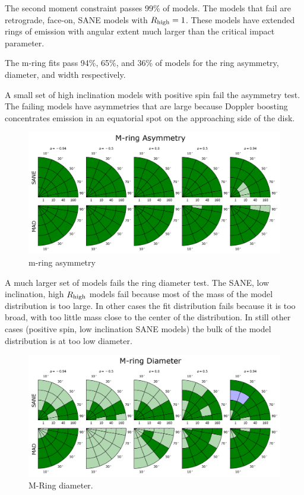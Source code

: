 The second moment constraint passes 99\% of models.  The models that fail are retrograde, face-on, SANE models with $R_\mathrm{high} = 1$. These models have extended rings of emission with angular extent much larger than the critical impact parameter.


The m-ring fits pass 94\%, 65\%, and 36\% of models for the ring asymmetry, diameter, and width respectively.

A small set of high inclination models with positive spin fail the asymmetry test.  The failing models have asymmetries that are large because Doppler boosting concentrates emission in an equatorial spot on the approaching side of the disk.

\begin{figure}
  \centering
  \includegraphics[width=\columnwidth]{./figures/Mring_f1_Constraints.png}
  \caption{m-ring asymmetry}
  \label{fig:cmp_m-ring_asymm}
\end{figure}

A much larger set of models fails the ring diameter test.
The SANE, low inclination, high $R_\mathrm{high}$ models fail because most of the mass of the model distribution is too large.  In other cases the fit distribution fails because it is too broad, with too little mass close to the center of the distribution.  In still other cases (positive spin, low inclination SANE models) the bulk of the model distribution is at too low diameter.

\begin{figure}
  \centering
  \includegraphics[width=\columnwidth]{./figures/Mring_d_Constraints.png}
  \caption{M-Ring diameter.}
  \label{fig:cmp_m-ring_diam}
\end{figure}

